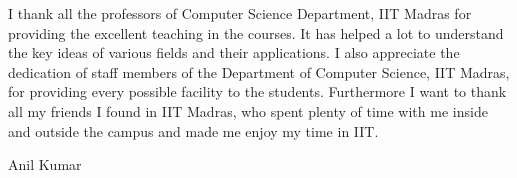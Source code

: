 \documentclass[MTech,thesis]{iitmdiss}
\begin{document}
I thank all the professors of Computer Science Department, IIT Madras for providing the excellent teaching in the courses. It has helped a lot to understand the key ideas of various fields and their applications. I also appreciate the dedication of staff members of the Department of Computer Science, IIT Madras, for providing every possible facility to the students.
Furthermore I want to thank all my friends I found in IIT Madras, who spent plenty of time with me inside and outside the campus and made me enjoy my time in IIT.
 


\hfill Anil Kumar



\begin{singlespace}
\tableofcontents
\thispagestyle{empty}

\listoftables
\listoffigures
{}
\end{singlespace}










%


%
%
%
%
%
% 
\pagebreak
\nocite{*}
\begin{singlespace}
  \begin{small}
	
	
%	
  \end{small}
\end{singlespace}

\end{document}
